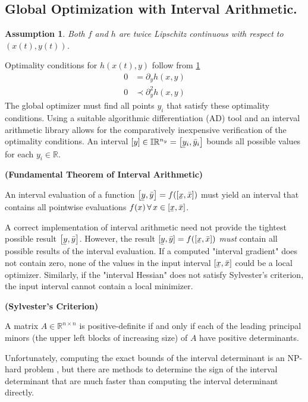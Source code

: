 \documentclass[twoside,leqno,twocolumn]{article}
\newcommand{\bbR}{\ensuremath{\mathbb{R}}}
\newcommand{\bbI}{\ensuremath{\mathbb{I}}}
\newcommand\ubar[1]{\underaccent{\bar}{#1}}
\newtheorem{assumption}{Assumption}[section]
\begin{document}
\subsection{Global Optimization with Interval Arithmetic.}
\begin{assumption} 
	\label{assume:twice-lipschitz}
	Both $f$ and $h$ are twice Lipschitz continuous with respect to $(x(t), y(t))$.
\end{assumption}
Optimality conditions for $h(x(t), y)$ follow from \ref{assume:twice-lipschitz}
\begin{equation}
	\label{eq:optimality-conditions}
	\begin{aligned}
		0 &= \partial_yh(x, y)\\
		0 &\prec\partial^2_{y}h(x, y)
	\end{aligned}
\end{equation}
The global optimizer must find all points $y_i$ that satisfy these optimality conditions. Using a suitable algorithmic differentiation (AD) tool and an interval arithmetic library allows for the comparatively inexpensive verification of the optimality conditions. An interval $[y] \in \bbI\bbR^{n_y} = \left[\ubar y_i, \bar y_i\right]$ bounds all possible values for each $y_i\in\bbR$. 

\begin{Definition}
	\label{def:interval-arith}
	\textbf{(Fundamental Theorem of Interval Arithmetic)}
	
	An interval evaluation of a function $\left[\ubar{y},\bar{y}\right] = f(\left[\ubar x, \bar x\right])$ must yield an interval that contains all pointwise evaluations $f(x)\,\forall\,x\in\left[\ubar x, \bar x\right]$.
\end{Definition}
A correct implementation of interval arithmetic need not provide the tightest possible result $\left[\ubar y, \bar y\right]$\cite{hickeyIntervalArithmeticPrinciples2001}. However, the result $[\ubar y, \bar y] = f(\left[\ubar x, \bar x\right])$ \textit{must} contain all possible results of the interval evaluation. If a computed "interval gradient" does not contain zero, none of the values in the input interval $\left[\ubar x, \bar x\right]$ could be a local optimizer. Similarly, if the "interval Hessian" does not satisfy Sylvester's criterion, the input interval cannot contain a local minimizer.
\begin{Definition}
	\label{def:sylvester}
	\textbf{(Sylvester's Criterion)}
	
	A matrix $A\in\bbR^{n\times n}$ is positive-definite if and only if each of the leading principal minors (the upper left blocks of increasing size) of $A$ have positive determinants.
\end{Definition}
Unfortunately, computing the exact bounds of the interval determinant is an NP-hard problem \cite{horacekDeterminantsIntervalMatrices2018}, but there are methods to determine the sign of the interval determinant that are much faster than computing the interval determinant directly.
\end{document}
